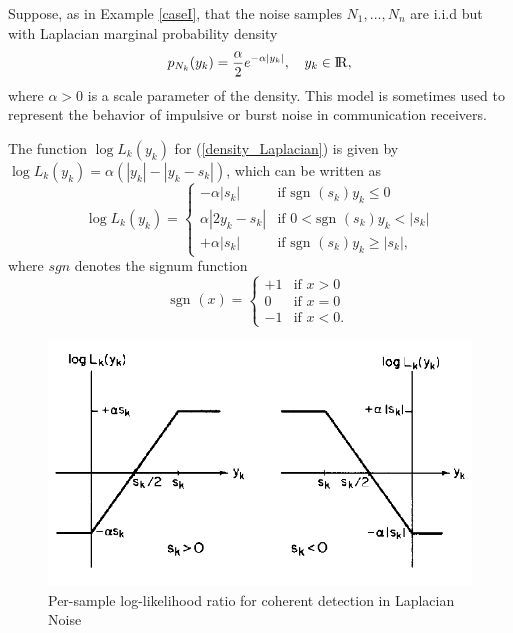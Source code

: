 \documentclass[a4paper,english,12pt]{article}
\begin{document}
\begin{exmp}
Suppose, as in Example \ref{caseI}, that the noise samples $N_{1},...,N_{n}$ are i.i.d but with Laplacian marginal probability density
\begin{equation}
\label{density_Laplacian}
p_{N_{k}}(y_{k}) = \frac{\alpha}{2} e^{-\alpha |y_{k}|},\hspace{10pt}y_{k}\in {\rm I\!R} ,
\end{equation}
where $\alpha>0$ is a scale parameter of the density. This model is sometimes used to represent the behavior of impulsive or burst noise in communication receivers.
\par The function $\log L_{k}(y_{k})$ for (\ref{density_Laplacian}) is given by $\log L_{k}(y_{k})=\alpha(|y_{k}|-|y_{k}-s_{k}|)$, which can be written as
\begin{equation}
\log L_{k}(y_{k})=\begin{cases}
-\alpha|s_{k}|&\text{if } \text{sgn } (s_{k})y_{k}\leq0\\
\alpha|2y_{k}-s_{k}|&\text{if }0<\text{sgn }(s_{k})y_{k}<|s_{k}|\\
+\alpha|s_{k}|&\text{if }\text{sgn }(s_{k})y_{k}\geq|s_{k}|,
\end{cases}
\end{equation}
where $sgn$ denotes the signum function
\begin{equation}
\text{sgn }(x)=\begin{cases}
+1&\text{if }x>0\\
0&\text{if }x=0\\
-1&\text{if }x<0.
\end{cases}
\end{equation}
\begin{figure}[h]
\centering
\captionsetup{justification=centering}
\includegraphics[width=0.8\linewidth]{Figures/lec10Fig2}
\caption{Per-sample log-likelihood ratio for coherent detection in Laplacian Noise}

\end{figure}
\end{exmp}
\end{document}
